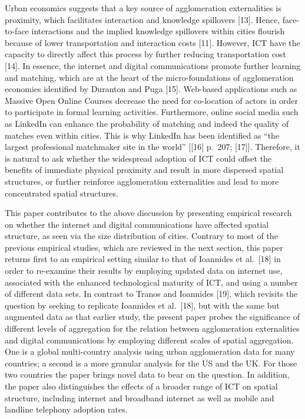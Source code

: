 \documentclass[10pt,letterpaper]{article}
\begin{document}
Urban economics suggests that a key source of agglomeration
externalities is proximity, which facilitates interaction and knowledge
spillovers {[}13{]}. Hence, face-to-face interactions and the implied
knowledge spillovers within cities flourish because of lower
transportation and interaction costs {[}11{]}. However, ICT have the
capacity to directly affect this process by further reducing
transportation cost {[}14{]}. In essence, the internet and digital
communications promote further learning and matching, which are at the
heart of the micro-foundations of agglomeration economies identified by
Duranton and Puga {[}15{]}. Web-based applications such as Massive Open
Online Courses decrease the need for co-location of actors in order to
participate in formal learning activities. Furthermore, online social
media such as LinkedIn can enhance the probability of matching and
indeed the quality of matches even within cities. This is why LinkedIn
has been identified as ``the largest professional matchmaker site in the
world'' {[}{[}16{]} p.~207; {[}17{]}{]}. Therefore, it is natural to ask
whether the widespread adoption of ICT could offset the benefits of
immediate physical proximity and result in more dispersed spatial
structures, or further reinforce agglomeration externalities and lead to
more concentrated spatial structures.

This paper contributes to the above discussion by presenting empirical
research on whether the internet and digital communications have
affected spatial structure, as seen via the size distribution of cities.
Contrary to most of the previous empirical studies, which are reviewed
in the next section, this paper returns first to an empirical setting
similar to that of Ioannides et al.~{[}18{]} in order to re-examine
their results by employing updated data on internet use, associated with
the enhanced technological maturity of ICT, and using a number of
different data sets. In contrast to Tranos and Ioannides {[}19{]}, which
revisits the question by seeking to replicate Ioannides et al.~{[}18{]},
but with the same but augmented data as that earlier study, the present
paper probes the significance of different levels of aggregation for the
relation between agglomeration externalities and digital communications
by employing different scales of spatial aggregation. One is a global
multi-country analysis using urban agglomeration data for many
countries; a second is a more granular analysis for the US and the UK.
For those two countries the paper brings novel data to bear on the
question. In addition, the paper also distinguishes the effects of a
broader range of ICT on spatial structure, including internet and
broadband internet as well as mobile and landline telephony adoption
rates.
\end{document}
